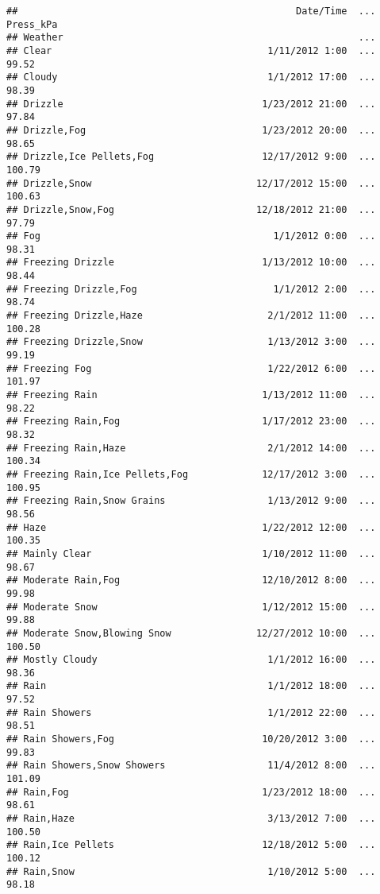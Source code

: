 \documentclass[
]{article}
\begin{document}
\begin{verbatim}
##                                                 Date/Time  ...  Press_kPa
## Weather                                                    ...           
## Clear                                      1/11/2012 1:00  ...      99.52
## Cloudy                                     1/1/2012 17:00  ...      98.39
## Drizzle                                   1/23/2012 21:00  ...      97.84
## Drizzle,Fog                               1/23/2012 20:00  ...      98.65
## Drizzle,Ice Pellets,Fog                   12/17/2012 9:00  ...     100.79
## Drizzle,Snow                             12/17/2012 15:00  ...     100.63
## Drizzle,Snow,Fog                         12/18/2012 21:00  ...      97.79
## Fog                                         1/1/2012 0:00  ...      98.31
## Freezing Drizzle                          1/13/2012 10:00  ...      98.44
## Freezing Drizzle,Fog                        1/1/2012 2:00  ...      98.74
## Freezing Drizzle,Haze                      2/1/2012 11:00  ...     100.28
## Freezing Drizzle,Snow                      1/13/2012 3:00  ...      99.19
## Freezing Fog                               1/22/2012 6:00  ...     101.97
## Freezing Rain                             1/13/2012 11:00  ...      98.22
## Freezing Rain,Fog                         1/17/2012 23:00  ...      98.32
## Freezing Rain,Haze                         2/1/2012 14:00  ...     100.34
## Freezing Rain,Ice Pellets,Fog             12/17/2012 3:00  ...     100.95
## Freezing Rain,Snow Grains                  1/13/2012 9:00  ...      98.56
## Haze                                      1/22/2012 12:00  ...     100.35
## Mainly Clear                              1/10/2012 11:00  ...      98.67
## Moderate Rain,Fog                         12/10/2012 8:00  ...      99.98
## Moderate Snow                             1/12/2012 15:00  ...      99.88
## Moderate Snow,Blowing Snow               12/27/2012 10:00  ...     100.50
## Mostly Cloudy                              1/1/2012 16:00  ...      98.36
## Rain                                       1/1/2012 18:00  ...      97.52
## Rain Showers                               1/1/2012 22:00  ...      98.51
## Rain Showers,Fog                          10/20/2012 3:00  ...      99.83
## Rain Showers,Snow Showers                  11/4/2012 8:00  ...     101.09
## Rain,Fog                                  1/23/2012 18:00  ...      98.61
## Rain,Haze                                  3/13/2012 7:00  ...     100.50
## Rain,Ice Pellets                          12/18/2012 5:00  ...     100.12
## Rain,Snow                                  1/10/2012 5:00  ...      98.18

\end{verbatim}
\end{document}
